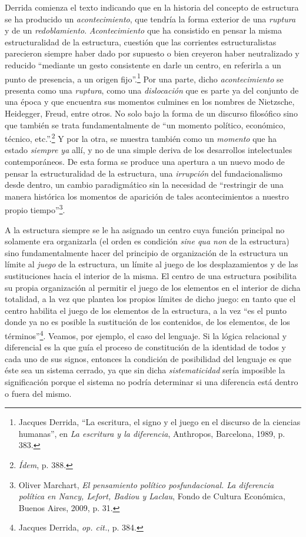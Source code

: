 Derrida comienza el texto indicando que en la historia del concepto de
estructura se ha producido un \emph{acontecimiento}, que tendría la
forma exterior de una \emph{ruptura} y de un \emph{redoblamiento}.
\emph{Acontecimiento} que ha consistido en pensar la misma
estructuralidad de la estructura, cuestión que las corrientes
estructuralistas parecieron siempre haber dado por supuesto o bien
creyeron haber neutralizado y reducido \enquote{mediante un gesto consistente en
darle un centro, en referirla a un punto de presencia, a un origen
fijo}.\footnote{Jacques Derrida, \enquote{La escritura, el signo y el juego en el
  discurso de la ciencias humanas}, en \emph{La escritura y la
  diferencia}, Anthropos, Barcelona, 1989, p. 383.} Por una parte,
dicho \emph{acontecimiento} se presenta como una \emph{ruptura}, como
una \emph{dislocación} que es parte ya del conjunto de una época y que
encuentra sus momentos culmines en los nombres de Nietzsche, Heidegger,
Freud, entre otros. No solo bajo la forma de un discurso filosófico sino
que también se trata fundamentalmente de \enquote{un momento político,
económico, técnico, etc.}.\footnote{\emph{Ídem}, p. 388.} Y por la otra,
se muestra también como un \emph{momento} que ha estado \emph{siempre
ya} allí, y no de una simple deriva de los desarrollos intelectuales
contemporáneos. De esta forma se produce una apertura a un nuevo modo de
pensar la estructuralidad de la estructura, una \emph{irrupción} del
fundacionalismo desde dentro, un cambio paradigmático sin la necesidad
de \enquote{restringir de una manera histórica los momentos de aparición de
tales acontecimientos a nuestro propio tiempo}\footnote{Oliver Marchart,
  \emph{El pensamiento político posfundacional. La diferencia política
  en Nancy, Lefort, Badiou y Laclau}, Fondo de Cultura Económica, Buenos
  Aires, 2009, p. 31.}.

A la estructura siempre se le ha asignado un centro cuya función
principal no solamente era organizarla (el orden es condición \emph{sine
qua non} de la estructura) sino fundamentalmente hacer del principio de
organización de la estructura un límite al \emph{juego} de la
estructura, un límite al juego de los desplazamientos y de las
sustituciones hacia el interior de la misma. El centro de una estructura
posibilita su propia organización al permitir el juego de los elementos
en el interior de dicha totalidad, a la vez que plantea los propios
límites de dicho juego: en tanto que el centro habilita el juego de los
elementos de la estructura, a la vez \enquote{es el punto donde ya no es posible
la sustitución de los contenidos, de los elementos, de los
términos}\footnote{Jacques Derrida, \emph{op. cit.}, p. 384.}. Veamos,
por ejemplo, el caso del lenguaje. Si la lógica relacional y diferencial
es la que guía el proceso de constitución de la identidad de todos y
cada uno de sus signos, entonces la condición de posibilidad del
lenguaje es que éste sea un sistema cerrado, ya que sin dicha
\emph{sistematicidad} sería imposible la significación porque el sistema
no podría determinar si una diferencia está dentro o fuera del mismo.

